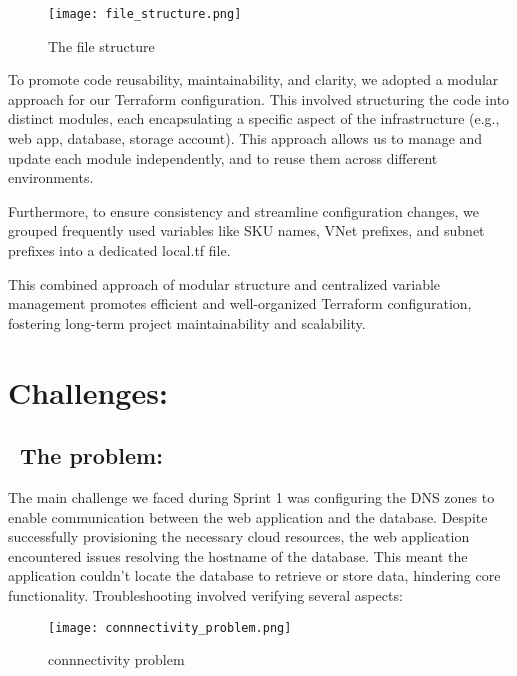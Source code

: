 \begin{figure}[htpb]
    \centering
    \texttt{[image: file\_structure.png]}
    \caption{The file structure}
    \label{fig:file_structure}
\end{figure}
To promote code reusability, maintainability, and clarity, we adopted a modular approach for our Terraform configuration. This involved structuring the code into distinct modules, each encapsulating a specific aspect of the infrastructure (e.g., web app, database, storage account). This approach allows us to manage and update each module independently, and to reuse them across different environments.
\par
Furthermore, to ensure consistency and streamline configuration changes, we grouped frequently used variables like SKU names, VNet prefixes, and subnet prefixes into a dedicated local.tf file.
\par
This combined approach of modular structure and centralized variable management promotes efficient and well-organized Terraform configuration, fostering long-term project maintainability and scalability.
\section{Challenges:}
\subsection*{ \textbullet\ The problem:}
The main challenge we faced during Sprint 1 was configuring the DNS zones to enable communication between the web application and the database. Despite successfully provisioning the necessary cloud resources, the web application encountered issues resolving the hostname of the database. This meant the application couldn't locate the database to retrieve or store data, hindering core functionality. Troubleshooting involved verifying several aspects:

\begin{figure}[htpb]
    \centering
    \texttt{[image: connnectivity\_problem.png]}
    \caption{connnectivity problem}
    \label{fig:connection_problem}
\end{figure}

